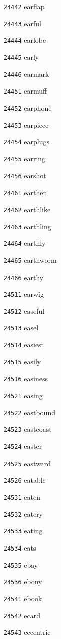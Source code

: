 \documentclass[twoside,11pt]{article}
\begin{document}
\begin{multicols}{5}
\begin{enumerate}
\item[\texttt{24442}] earflap
\item[\texttt{24443}] earful
\item[\texttt{24444}] earlobe
\item[\texttt{24445}] early
\item[\texttt{24446}] earmark
\item[\texttt{24451}] earmuff
\item[\texttt{24452}] earphone
\item[\texttt{24453}] earpiece
\item[\texttt{24454}] earplugs
\item[\texttt{24455}] earring
\item[\texttt{24456}] earshot
\item[\texttt{24461}] earthen
\item[\texttt{24462}] earthlike
\item[\texttt{24463}] earthling
\item[\texttt{24464}] earthly
\item[\texttt{24465}] earthworm
\item[\texttt{24466}] earthy
\item[\texttt{24511}] earwig
\item[\texttt{24512}] easeful
\item[\texttt{24513}] easel
\item[\texttt{24514}] easiest
\item[\texttt{24515}] easily
\item[\texttt{24516}] easiness
\item[\texttt{24521}] easing
\item[\texttt{24522}] eastbound
\item[\texttt{24523}] eastcoast
\item[\texttt{24524}] easter
\item[\texttt{24525}] eastward
\item[\texttt{24526}] eatable
\item[\texttt{24531}] eaten
\item[\texttt{24532}] eatery
\item[\texttt{24533}] eating
\item[\texttt{24534}] eats
\item[\texttt{24535}] ebay
\item[\texttt{24536}] ebony
\item[\texttt{24541}] ebook
\item[\texttt{24542}] ecard
\item[\texttt{24543}] eccentric

\end{enumerate}
\end{multicols}
\end{document}

